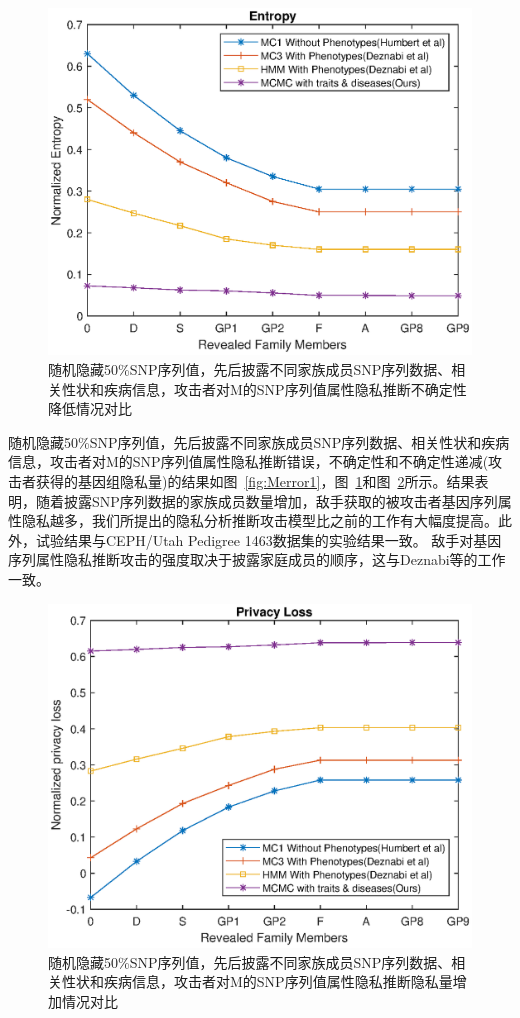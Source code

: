 \begin{figure}[htbp]
	\centering
	\includegraphics[width=0.8\linewidth]{./figures/Mentropy1.eps}
	\centering
	\caption{随机隐藏50\%SNP序列值，先后披露不同家族成员SNP序列数据、相关性状和疾病信息，攻击者对M的SNP序列值属性隐私推断不确定性降低情况对比}\label{fig:Mentropy}
\end{figure}


随机隐藏50\%SNP序列值，先后披露不同家族成员SNP序列数据、相关性状和疾病信息，攻击者对M的SNP序列值属性隐私推断错误，不确定性和不确定性递减(攻击者获得的基因组隐私量)的结果如图~\ref{fig:Merror1}，图~\ref{fig:Mentropy}和图~\ref{fig:Mprivacyloss}所示。结果表明，随着披露SNP序列数据的家族成员数量增加，敌手获取的被攻击者基因序列属性隐私越多，我们所提出的隐私分析推断攻击模型比之前的工作有大幅度提高。此外，试验结果与CEPH/Utah Pedigree 1463数据集的实验结果一致。 敌手对基因序列属性隐私推断攻击的强度取决于披露家庭成员的顺序，这与Deznabi等的工作一致。

\begin{figure}[htbp]
	\centering
	\includegraphics[width=0.8\linewidth]{./figures/Mprivacyloss.eps}
	\centering
	\caption{随机隐藏50\%SNP序列值，先后披露不同家族成员SNP序列数据、相关性状和疾病信息，攻击者对M的SNP序列值属性隐私推断隐私量增加情况对比}\label{fig:Mprivacyloss}
\end{figure}

